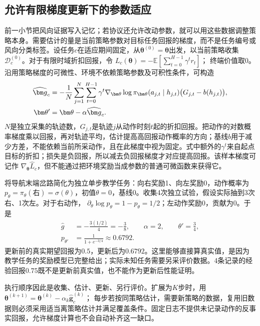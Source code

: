 \subsection{允许有限梯度更新下的参数适应}
\label{sec:rl-transfer-gradient-adaptation}

前一小节把风向证据写入记忆；若协议还允许改动参数，就可以用这些数据调整策略本身。需要估计的量是当前策略参数对目标任务回报的梯度，而不是任务编号或风向分类标签。设任务$c$在适应期间固定，从$\bm\theta^{(0)}=\bm\theta$出发，以当前策略收集$\mathcal D_c^{(0)}$。对于有限时域折扣回报，令
$L_c(\bm\theta)=-\mathbb E[\sum_{t=0}^{H-1}\gamma^t r_t]$；
终端价值取0。沿用策略梯度的可微性、环境不依赖策略参数及可积性条件，可构造
\begin{align}
 \widehat{\bm g}_c
 &=-\frac1N\sum_{j=1}^N\sum_{t=0}^{H-1}
   \gamma^t\nabla_{\bm\theta}\log\pi_{\bm\theta}
        (a_{j,t}\mid h_{j,t})
   \bigl(G_{j,t}-b(h_{j,t})\bigr),\notag\\
 \bm\theta'&=\bm\theta-\alpha\widehat{\bm g}_c.
 \label{eq:rl-transfer-inner-update}
\end{align}
$N$是独立采集的轨迹数，$G_{j,t}$是轨迹$j$从动作时刻$t$起的折扣回报。把动作的对数概率梯度乘以回报，再对轨迹平均，估计提高高回报动作概率的方向；基线$b$用于减少方差，不能依赖当前所采动作，且在此梯度中视为固定。式中额外的$\gamma^t$来自起点目标的折扣；损失是负回报，所以减去负回报梯度才对应提高回报。该样本梯度可记作
$\nabla_{\bm\theta}\widehat L_c$，但不能通过把环境奖励当成参数的普通可微函数来获得它。

\begin{example}[一次目标任务参数更新]
 \label{ex:rl-transfer-gradient-step}
 将导航末端岔路简化为独立单步教学任务：向右奖励1、向左奖励0，动作概率为
 $p_\theta=\pi_\theta(\text{右})=\sigma(\theta)$，初值$\theta=0$，基线0。收集4次独立试验，假设实际抽到3次右、1次左。对于右动作，
 $\partial_\theta\log p_\theta=1-p_\theta=1/2$；左动作奖励0，贡献为0。于是
 \[
 \begin{aligned}
 \widehat g&=-\frac{3(1/2)}4=-\frac38,\qquad
 \alpha=2,\qquad \theta'=\frac34,\\
 p_{\theta'}&=\frac1{1+e^{-3/4}}\approx0.6792.
 \end{aligned}
 \]
 更新前的真实期望回报为$0.5$，更新后为$0.6792$。这里能够直接算真实值，是因为教学任务的奖励模型已完整给出；实际未知任务需要另采评价数据。4条记录的经验回报$0.75$既不是更新前真实值，也不能作为更新后性能证明。
\end{example}

执行顺序因此是收集、估计、更新、另行评价。扩展为$K$步时，用
$\bm\theta^{(k+1)}=\bm\theta^{(k)}-\alpha_k\widehat{\bm g}_c^{(k)}$；
每步若按同策略估计，需要新策略的数据，复用旧数据则必须采用适当离策略估计并满足覆盖条件。固定日志不提供未记录动作的反事实回报，允许梯度计算也不会自动补齐这一缺口。

